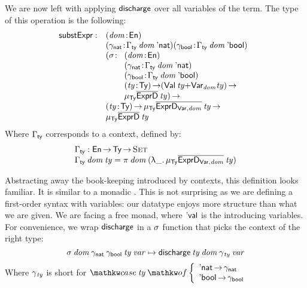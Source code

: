 We are now left with applying $\discharge$ over all variables of the
term. The type of this operation is the following:
%
\[
\begin{array}{@{}ll}
\substH  : & \PITEL{\V{dom}}{\EnumU} \\
           & \PITEL{\V{\gammaNat}}{\GammaSpi{\V{dom}}{\Enat}} 
             \PITEL{\V{\gammaBool}}{\GammaSpi{\V{dom}}{\Ebool}} \\
           & \begin{array}{@{}ll}
             \PI{\V{\sigma}}{& \PITEL{\V{dom}}{\EnumU} \\
                             & \PITEL{\V{\gammaNat}}
                                     {\GammaSpi{\V{dom}}{\Enat}} \\
                             & \PITEL{\V{\gammaBool}}
                                     {\GammaSpi{\V{dom}}{\Ebool}} \\
                             & \PI{\V{ty}}{\Ty} (\SUM{\Val{\V{ty}}}{\Var{\V{dom}}{\V{ty}}}) \To \\
                             & \IMu{\Ty}{\toIDesc{\HExprD}}{\V{ty}}}
             \end{array}\\
          & \PI{\V{ty}}{\Ty}
            \IMu{\Ty}{\toIDesc{\HExprVarD{\V{dom}}}}{\V{ty}} \To \\
          & \IMu{\Ty}{\toIDesc{\HExprD}}{\V{ty}}
\end{array}
\]
%
Where $\SYMBGammaSpi$ corresponds to a context, defined by:
%
\[\stk{
\SYMBGammaSpi : \EnumU \To \Ty \To \Set                                             \\
\GammaSpi{\V{dom}}{\V{ty}} = \spi{\V{dom}}{(\LAM{\_} \IMu{\Ty}{\toIDesc{\HExprVarD{\V{dom}}}}{\V{ty}})} 
}\]


Abstracting away the book-keeping introduced by contexts, this
definition looks familiar. It is similar to a monadic \bind. This is
not surprising as we are defining a first-order syntax with variables:
our datatype enjoys more structure than what we are given. We are
facing a free monad, where $\SYMBEval$ is the \return introducing
variables. For convenience, we wrap $\discharge$ in a $\V{\sigma}$
function that picks the context of the right type:
%
\[
\F{$\sigma$}\: \V{dom}\: \gammaNat\: \gammaBool\: \V{ty}\: \V{var} \mapsto
    \F{$\discharge$}\: \V{ty}\: \V{dom}\: \F{$\gamma$}_{\V{ty}}\: \V{var} 
\]
%
Where $\F{$\gamma$}_{\V{ty}}$ is short for
 $\caseB{\V{ty}}{\Enat  \To \gammaNat \\
                 \Ebool \To \gammaBool}$

